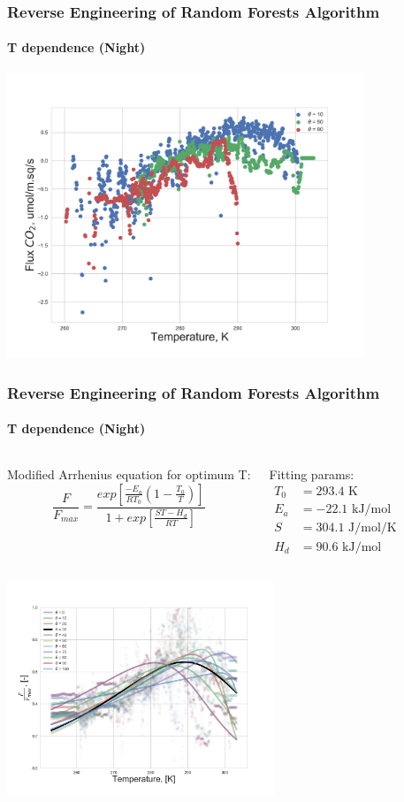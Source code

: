 \documentclass{beamer}
\begin{document}
\begin{frame}
\frametitle{Reverse Engineering of Random Forests Algorithm}
\framesubtitle{T dependence (Night)}
\centering
\includegraphics[width=0.8\textwidth]{T_dependence.png}\\
\end{frame}


\begin{frame}
\frametitle{Reverse Engineering of Random Forests Algorithm}
\framesubtitle{T dependence (Night)}

\begin{columns}[t]
\tiny
{}
\centering
Modified Arrhenius equation for optimum T:
\begin{equation}
    \frac{F}{F_{max}} = \frac{exp\left[\frac{-E_a}{RT_0}\left(1 - \frac{T_0}{T} \right)\right]}{1 + exp\left[ \frac{S T - H_d}{RT} \right]}
\end{equation}

\tiny
\centering
Fitting params:
\begin{align}
T_0 &= 293.4 \text{ K} \\
E_a &= - 22.1 \text{ kJ/mol} \\
S &= 304.1 \text{ J/mol/K} \\
H_d &= 90.6 \text{ kJ/mol}
\end{align}


\end{columns}
\centering
\includegraphics[width=0.6\textwidth]{T_dependence_all.png}
\end{frame}
\end{document}
